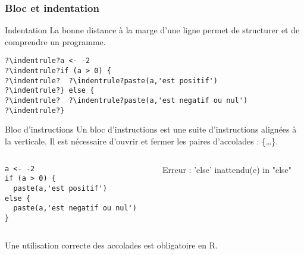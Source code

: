 \documentclass[10pt]{beamer}
\begin{document}
\begin{frame}[fragile]
  \frametitle{Bloc et indentation}
  \begin{block}{Indentation}
    La bonne distance à la marge d'une ligne permet de structurer et de comprendre un programme.
        \newcommand{\indentrule}{\color{DarkBlue}\vrule\hspace{2pt}}        
  \begin{lstlisting}[style=editor, escapechar=?]
?\indentrule?a <- -2
?\indentrule?if (a > 0) {
?\indentrule?  ?\indentrule?paste(a,'est positif')
?\indentrule?} else {
?\indentrule?  ?\indentrule?paste(a,'est negatif ou nul')
?\indentrule?}    
\end{lstlisting}
 \end{block}

 \begin{block}{Bloc d'instructions}
   Un bloc d'instructions est une suite d'instructions alignées à la verticale.
   Il est nécessaire d’ouvrir et fermer les paires d’accolades : \{\dots\}.
   \begin{columns}[c]
     \begin{column}{0.58\textwidth}
       \newcommand{\indentrule}{\color{DarkBlue}\vrule\hspace{2pt}}        
       \begin{lstlisting}[style=editor, escapechar=?]
a <- -2
if (a > 0) {
  paste(a,'est positif')
else { 
  paste(a,'est negatif ou nul')
}    
\end{lstlisting}
\end{column}
\begin{column}{0.42\textwidth}
\RUN
\alert{Erreur : 'else' inattendu(e) in "else"}
\end{column}
\end{columns} 
\end{block}

\begin{center}
  \alert{Une utilisation correcte des accolades est obligatoire en R.}
\end{center}
\end{frame}
\end{document}
